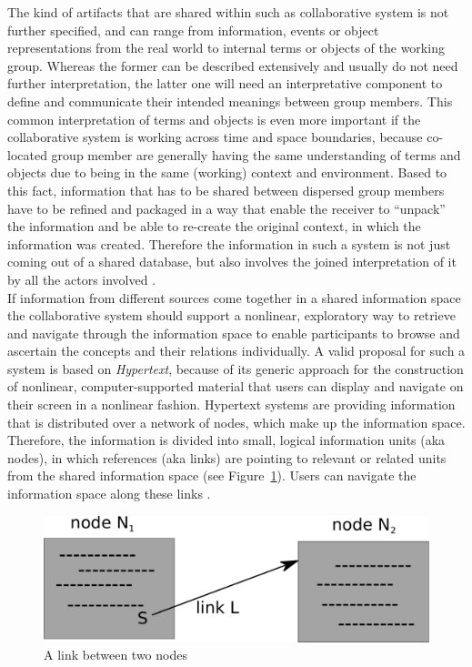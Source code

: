 The kind of artifacts that are shared within such as collaborative system is not further specified, and can range from information, events or object representations from the real world to internal terms or objects of the working group. Whereas the former can be described extensively and usually do not need further interpretation, the latter one will need an interpretative component to define and communicate their intended meanings between group members. This common interpretation of terms and objects is even more important if the collaborative system is working across time and space boundaries, because co-located group member are generally having the same understanding of terms and objects due to being in the same (working) context and environment. Based to this fact, information that has to be shared between dispersed group members have to be refined and packaged in a way that enable the receiver to ``unpack'' the information and be able to re-create the original context, in which the information was created. Therefore the information in such a system is not just coming out of a shared database, but also involves the joined interpretation of it by all the actors involved \citep{bannon1997constructing}. \\

If information from different sources come together in a shared information space the collaborative system should support a nonlinear, exploratory way to retrieve and navigate through the information space to enable participants to browse and ascertain the concepts and their relations individually. A valid proposal for such a system is based on \emph{Hypertext}, because of its generic approach for the construction of nonlinear, computer-supported material that users can display and navigate on their screen in a nonlinear fashion. Hypertext systems are providing information that is distributed over a network of nodes, which make up the information space. Therefore, the information is divided into small, logical information units (aka nodes), in which references (aka links) are pointing to relevant or related units from the shared information space (see Figure~\ref{fig:images_cscw_hypertext_concept}). Users can navigate the information space along these links \citep[pg. 295-307]{borghoff2000computer}. \@

\begin{figure}[H]
  \centering
  \includegraphics[width=0.9\columnwidth]{images/Hypertext.pdf}
  \caption[A link between two nodes]{A link between two nodes \citep[pg. 303]{borghoff2000computer}}
  \label{fig:images_cscw_hypertext_concept}
\end{figure}

